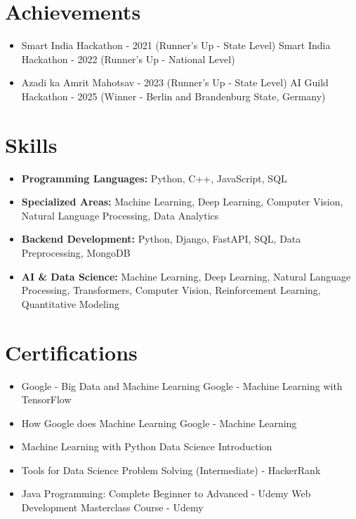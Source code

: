 \documentclass[a4paper,10pt]{article}
\begin{document}
\section*{Achievements}
\begin{itemize}
\item Smart India Hackathon - 2021 (Runner's Up - State Level) \hfill Smart India Hackathon - 2022 (Runner's Up - National Level)
\item Azadi ka Amrit Mahotsav - 2023 (Runner's Up - State Level) \hfill AI Guild Hackathon - 2025 (Winner - Berlin and Brandenburg State, Germany)
\end{itemize}

\section*{Skills}
\begin{itemize}
  \item \textbf{Programming Languages:} Python, C++, JavaScript, SQL
  \item \textbf{Specialized Areas:} Machine Learning, Deep Learning, Computer Vision, Natural Language Processing, Data Analytics
  \item \textbf{Backend Development:} Python, Django, FastAPI, SQL, Data Preprocessing, MongoDB
  \item \textbf{AI \& Data Science:} Machine Learning, Deep Learning, Natural Language Processing, Transformers, Computer Vision, Reinforcement Learning, Quantitative Modeling
\end{itemize}

\section*{Certifications}
\begin{itemize}
\item Google - Big Data and Machine Learning \hfill Google - Machine Learning with TensorFlow
\item How Google does Machine Learning \hfill Google - Machine Learning
\item Machine Learning with Python \hfill Data Science Introduction
\item Tools for Data Science \hfill Problem Solving (Intermediate) - HackerRank
\item Java Programming: Complete Beginner to Advanced - Udemy \hfill Web Development Masterclass Course - Udemy
\end{itemize}
\end{document}
